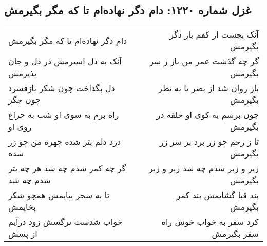 \begin{center}
\section*{غزل شماره ۱۲۲۰: دام دگر نهاده‌ام تا که مگر بگیرمش}
\label{sec:1220}
\begin{longtable}{l p{0.5cm} r}
دام دگر نهاده‌ام تا که مگر بگیرمش
&&
آنک بجست از کفم بار دگر بگیرمش
\\
آنک به دل اسیرمش در دل و جان پذیرمش
&&
گر چه گذشت عمر من باز ز سر بگیرمش
\\
دل بگداخت چون شکر بازفسرد چون جگر
&&
باز روان شد از بصر تا به نظر بگیرمش
\\
راه برم به سوی او شب به چراغ روی او
&&
چون برسم به کوی او حلقه در بگیرمش
\\
درد دلم بتر شده چهره من چو زر شده
&&
تا ز رخم چو زر برد بر سر زر بگیرمش
\\
گر چه کمر شدم چه شد هر چه بتر شدم چه شد
&&
زیر و زبر شدم چه شد زیر و زبر بگیرمش
\\
تا به سحر بپایمش همچو شکر بخایمش
&&
بند قبا گشایمش بند کمر بگیرمش
\\
خواب شدست نرگسش زود درآیم از پسش
&&
کرد سفر به خواب خوش راه سفر بگیرمش
\\
\end{longtable}
\end{center}
